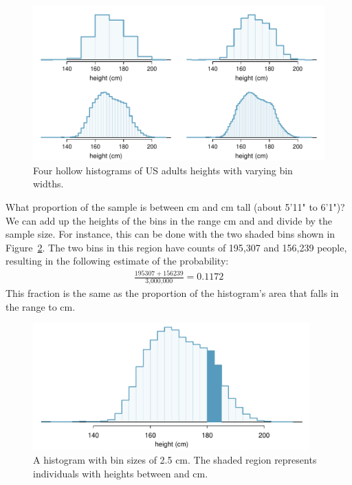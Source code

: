 \begin{figure}[ht]
\centering
\includegraphics[width=\textwidth]{ch_probability/figures/fdicHistograms/fdicHistograms}
\caption{Four hollow histograms of US adults heights with varying bin widths.}
\label{fdicHistograms}
\end{figure}

\begin{example}{What proportion of the sample is between  cm and  cm tall (about 5'11" to 6'1")?}\label{contDistProb}
We can add up the heights of the bins in the range  cm and  and divide by the sample size. For instance, this can be done with the two shaded bins shown in Figure~\ref{usHeightsHist180185}. The two bins in this region have counts of 195,307 and 156,239 people, resulting in the following estimate of the probability:
\begin{eqnarray*}
\frac{195307+156239}{\text{3,000,000}} = 0.1172
\end{eqnarray*}
This fraction is the same as the proportion of the histogram's area that falls in the range  to  cm.
\end{example}

\begin{figure}
\centering
\includegraphics[width=0.95\textwidth]{ch_probability/figures/usHeightsHist180185/usHeightsHist180185}
\caption{A histogram with bin sizes of 2.5 cm. The shaded region represents individuals with heights between  and  cm.}
\label{usHeightsHist180185}
\end{figure}

